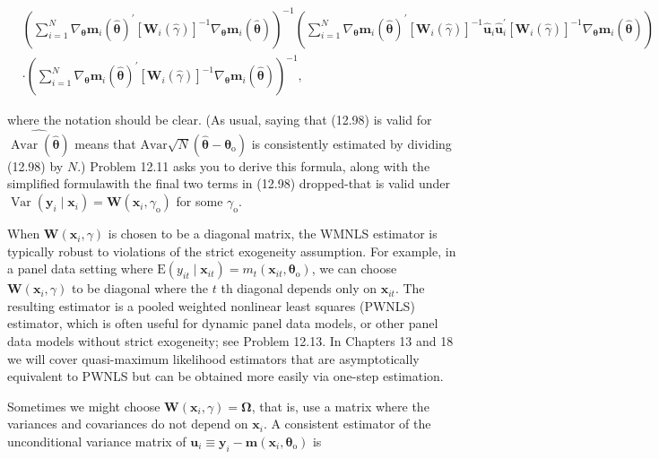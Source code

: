 \documentclass[10pt]{article}
\begin{document}
\begin{align*}
&\left(\sum_{i=1}^{N} \nabla_{\boldsymbol{\theta}} \mathbf{m}_{i}(\hat{\boldsymbol{\theta}})^{\prime}\left[\mathbf{W}_{i}(\hat{\gamma})\right]^{-1} \nabla_{\boldsymbol{\theta}} \mathbf{m}_{i}(\hat{\boldsymbol{\theta}})\right)^{-1}\left(\sum_{i=1}^{N} \nabla_{\boldsymbol{\theta}} \mathbf{m}_{i}(\hat{\boldsymbol{\theta}})^{\prime}\left[\mathbf{W}_{i}(\hat{\gamma})\right]^{-1} \hat{\mathbf{u}}_{i} \hat{\mathbf{u}}_{i}^{\prime}\left[\mathbf{W}_{i}(\hat{\gamma})\right]^{-1} \nabla_{\boldsymbol{\theta}} \mathbf{m}_{i}(\hat{\boldsymbol{\theta}})\right) \\
& \cdot\left(\sum_{i=1}^{N} \nabla_{\boldsymbol{\theta}} \mathbf{m}_{i}(\hat{\boldsymbol{\theta}})^{\prime}\left[\mathbf{W}_{i}(\hat{\gamma})\right]^{-1} \nabla_{\boldsymbol{\theta}} \mathbf{m}_{i}(\hat{\boldsymbol{\theta}})\right)^{-1}, \tag{12.98}
\end{align*}


where the notation should be clear. (As usual, saying that (12.98) is valid for $\widehat{\operatorname{Avar}(\hat{\boldsymbol{\theta}})}$ means that $\mathrm{Avar} \sqrt{N}\left(\hat{\boldsymbol{\theta}}-\boldsymbol{\theta}_{\mathrm{o}}\right)$ is consistently estimated by dividing (12.98) by $N$.) Problem 12.11 asks you to derive this formula, along with the simplified formulawith the final two terms in (12.98) dropped-that is valid under $\operatorname{Var}\left(\mathbf{y}_{i} \mid \mathbf{x}_{i}\right)= \mathbf{W}\left(\mathbf{x}_{i}, \gamma_{\mathrm{o}}\right)$ for some $\gamma_{\mathrm{o}}$.

When $\mathbf{W}\left(\mathbf{x}_{i}, \gamma\right)$ is chosen to be a diagonal matrix, the WMNLS estimator is typically robust to violations of the strict exogeneity assumption. For example, in a panel data setting where $\mathrm{E}\left(y_{i t} \mid \mathbf{x}_{i t}\right)=m_{t}\left(\mathbf{x}_{i t}, \boldsymbol{\theta}_{\mathrm{o}}\right)$, we can choose $\mathbf{W}\left(\mathbf{x}_{i}, \gamma\right)$ to be diagonal where the $t$ th diagonal depends only on $\mathbf{x}_{i t}$. The resulting estimator is a pooled weighted nonlinear least squares (PWNLS) estimator, which is often useful for dynamic panel data models, or other panel data models without strict exogeneity; see Problem 12.13. In Chapters 13 and 18 we will cover quasi-maximum likelihood estimators that are asymptotically equivalent to PWNLS but can be obtained more easily via one-step estimation.

Sometimes we might choose $\mathbf{W}\left(\mathbf{x}_{i}, \gamma\right)=\boldsymbol{\Omega}$, that is, use a matrix where the variances and covariances do not depend on $\mathbf{x}_{i}$. A consistent estimator of the unconditional variance matrix of $\mathbf{u}_{i} \equiv \mathbf{y}_{i}-\mathbf{m}\left(\mathbf{x}_{i}, \boldsymbol{\theta}_{\mathrm{o}}\right)$ is
\end{document}
